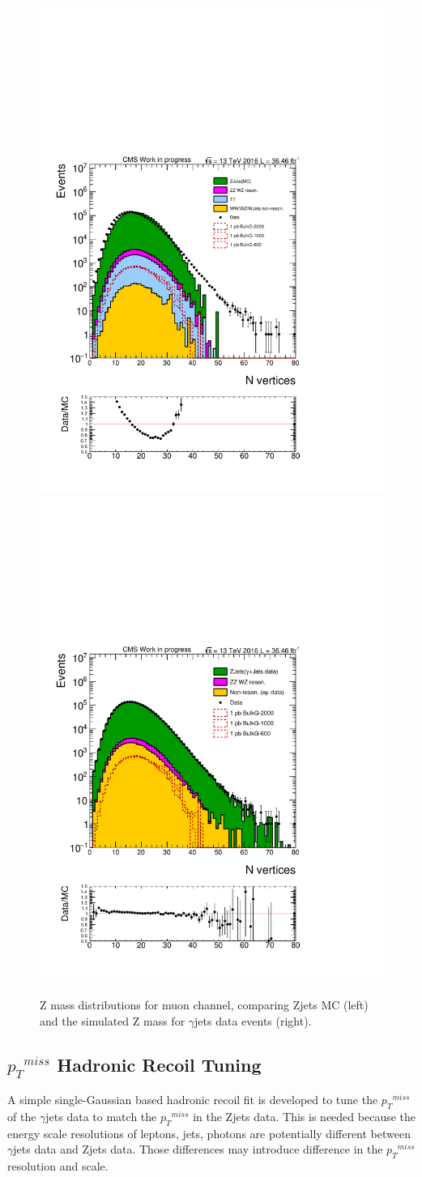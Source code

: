 \begin{figure}[htbp!]
\centering
\includegraphics[width=0.46\linewidth,page=8]{figures/MC2_Rc36p46DtReCalib_RhoWt_GMCEtaWt_tightzpt50_puWeightmoriondMC_metfilter_mu_log_1pb.pdf}
\includegraphics[width=0.46\linewidth,page=8]{figures/GJets2_BkgSub_Rc36p46DtReCalib_NonReso_RhoWt_GMCEtaWt_tightzpt50_puWeightmoriondMC_muoneg_gjet_metfilter_mu_log_1pb.pdf}
\caption{Z mass distributions for muon channel, comparing Zjets MC (left) and the simulated Z mass for $\gamma$jets data events (right).}
\label{fig:mz_mu_zjets_gjets}
\end{figure}

\subsection{${p_{T}}^{miss}$ Hadronic Recoil Tuning}
A simple single-Gaussian based hadronic recoil fit is developed to tune the ${p_{T}}^{miss}$ of the $\gamma$jets data to match the ${p_{T}}^{miss}$ in the Zjets data.
This is needed because the energy scale resolutions of leptons, jets, photons are potentially different between $\gamma$jets data and Zjets data. Those differences may introduce difference in the ${p_{T}}^{miss}$ resolution and scale. 

